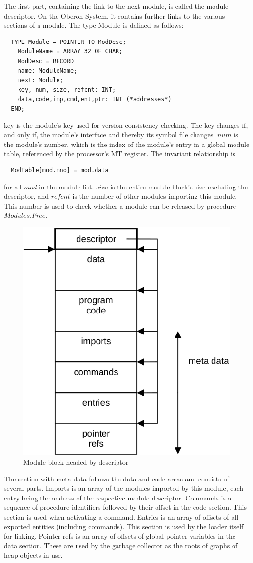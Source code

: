 The first part, containing the link to the next module, is called the module descriptor. On the Oberon
System, it contains further links to the various sections of a module. The type Module is defined as
follows:
\begin{verbatim}
  TYPE Module = POINTER TO ModDesc;
    ModuleName = ARRAY 32 OF CHAR;
    ModDesc = RECORD
    name: ModuleName;
    next: Module;
    key, num, size, refcnt: INT;
    data,code,imp,cmd,ent,ptr: INT (*addresses*)
  END;
\end{verbatim}

key is the module's key used for version consistency checking. The key changes if, and only if, the
module's interface and thereby its symbol file changes. $num$ is the module's number, which is the
index of the module's entry in a global module table, referenced by the processor's MT register. The
invariant relationship is
\begin{verbatim}
  ModTable[mod.mno] = mod.data
\end{verbatim}

for all $mod$ in the module list. $size$ is the entire module block's size excluding the descriptor, and $refcnt$
is the number of other modules importing this module. This number is used to check whether a
module can be released by procedure $Modules.Free$.
\begin{figure}
  \label{fig:module-block}
  \centering
  \includegraphics[width=.6\textwidth]{i/k}
  \caption{Module block headed by descriptor}
\end{figure}

The section with meta data follows the data and code areas and consists of several parts. Imports is
an array of the modules imported by this module, each entry being the address of the respective
module descriptor. Commands is a sequence of procedure identifiers followed by their offset in the
code section. This section is used when activating a command. Entries is an array of offsets of all
exported entities (including commands). This section is used by the loader itself for linking. Pointer
refs is an array of offsets of global pointer variables in the data section. These are used by the
garbage collector as the roots of graphs of heap objects in use.

